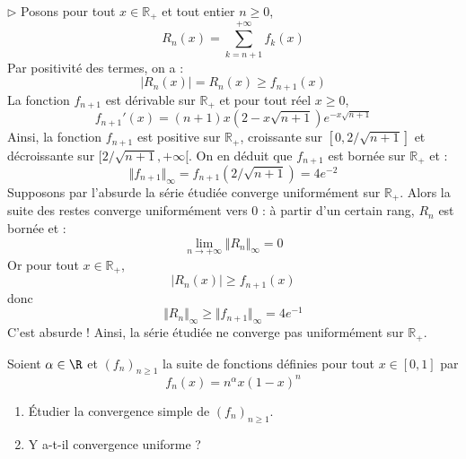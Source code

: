 \documentclass[a4paper,10pt]{report}
\begin{document}
\medskip

\noindent $\rhd$ Posons pour tout $x \in \mathbb{R}_+$ et tout entier $n \geq 0$,
$$ R_n(x) = \sum_{k=n+1}^{+ \infty} f_k(x)$$
Par positivité des termes, on a :
$$ \vert R_n(x) \vert = R_n(x) \geq f_{n+1}(x)$$
La fonction $f_{n+1}$ est dérivable sur $\mathbb{R}_+$ et pour tout réel $x \geq 0$,
$$ f_{n+1}'(x) = (n+1)x (2-x \sqrt{n+1})e^{-x \sqrt{n+1}}$$
Ainsi, la fonction $f_{n+1}$ est positive sur $\mathbb{R}_+$, croissante sur $[0, 2/ \sqrt{n+1}]$ et décroissante sur $[2/\sqrt{n+1}, + \infty[$. On en déduit que $f_{n+1}$ est bornée sur $\mathbb{R}_+$ et :
$$ \Vert f_{n+1} \Vert_{\infty} = f_{n+1}(2/\sqrt{n+1}) = 4 e^{-2}$$
Supposons par l'absurde la série étudiée converge uniformément sur $\mathbb{R}_+$. Alors la suite des restes converge uniformément vers $0$ : à partir d'un certain rang, $R_n$ est bornée et :
$$ \lim_{n \rightarrow + \infty} \Vert R_n \Vert_{ \infty} = 0$$
Or pour tout $x \in \mathbb{R}_+$,
$$  \vert R_n(x) \vert \geq f_{n+1}(x)$$
donc 
$$ \Vert R_n \Vert_{\infty} \geq \Vert f_{n+1} \Vert_{\infty} = 4 e^{-1}$$
C'est absurde ! Ainsi, la série étudiée ne converge pas uniformément sur $\mathbb{R}_+$.

\begin{Exercice}{} Soient $\alpha \in \R$ et $(f_n)_{n \geq 1}$ la suite de fonctions définies pour tout $x \in [0,1]$ par 
$$f_n(x) = n^\alpha x(1-x)^n$$

\begin{enumerate}
 \item Étudier la convergence simple de $(f_n)_{n \geq 1}$.
 \item Y a-t-il convergence uniforme ?
  \end{enumerate}
\end{Exercice}

\corr 
\end{document}
